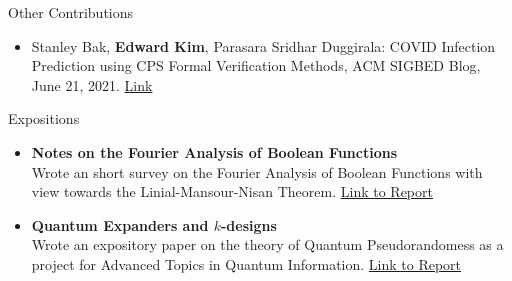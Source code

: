 \documentclass{resume} %
\begin{document}
\begin{rSection}{Other Contributions}
  \begin{itemize}
    \item Stanley Bak, {\bf Edward Kim}, Parasara Sridhar Duggirala: COVID Infection Prediction using CPS Formal Verification Methods, ACM SIGBED Blog, June 21, 2021. \href{https://sigbed.org/2021/06/21/sidbed-blog-covid-formal-verification/}{Link}
  \end{itemize}
\end{rSection}

\begin{rSection}{Expositions}
  \begin{itemize}
    \item {\bf Notes on the Fourier Analysis of Boolean Functions}
    \hfill \\
    Wrote an short survey on the Fourier Analysis of Boolean Functions with view towards the Linial-Mansour-Nisan Theorem.
    \href{https://github.com/ekim1919/Research/blob/master/CS590/EdwardKimPaper.pdf}{Link to Report}
    \item {\bf Quantum Expanders and $k$-designs} \hfill \\
    Wrote an expository paper on the theory of Quantum Pseudorandomess as a project for Advanced Topics in Quantum Information.
    \href{https://github.com/ekim1919/Research/blob/master/PHYS790/final.pdf}{Link to Report}
  \end{itemize}
\end{rSection}
\end{document}
